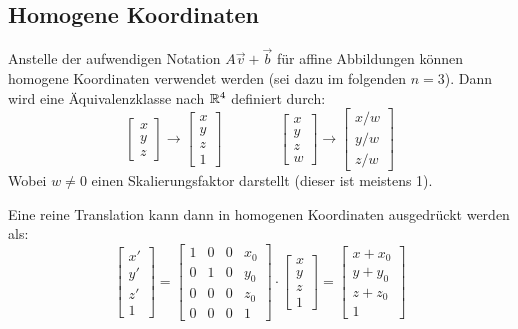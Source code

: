		\subsection{Homogene Koordinaten}
			Anstelle der aufwendigen Notation \( A\vec{v} + \vec{b} \) für affine Abbildungen können homogene Koordinaten verwendet werden (sei dazu im folgenden \( n = 3 \)). Dann wird eine Äquivalenzklasse nach \( \mathbb{R}^4 \) definiert durch:
			\begin{equation*}
				\begin{bmatrix}
					x \\
					y \\
					z
				\end{bmatrix}
				\to
				\begin{bmatrix}
					x \\
					y \\
					z \\
					1
				\end{bmatrix}
				\quad\quad\quad\quad
				\begin{bmatrix}
					x \\
					y \\
					z \\
					w
				\end{bmatrix}
				\to
				\begin{bmatrix}
					x/w \\
					y/w \\
					z/w
				\end{bmatrix}
			\end{equation*}
			Wobei \( w \neq 0 \) einen Skalierungsfaktor darstellt (dieser ist meistens \num{1}).
			
			Eine reine Translation kann dann in homogenen Koordinaten ausgedrückt werden als:
			\begin{equation*}
				\begin{bmatrix}
					x' \\
					y' \\
					z' \\
					1
				\end{bmatrix}
				=
				\begin{bmatrix}
					1 & 0 & 0 & x_0 \\
					0 & 1 & 0 & y_0 \\
					0 & 0 & 0 & z_0 \\
					0 & 0 & 0 & 1
				\end{bmatrix}
				\cdot
				\begin{bmatrix}
					x \\
					y \\
					z \\
					1
				\end{bmatrix}
				=
				\begin{bmatrix}
					x + x_0 \\
					y + y_0 \\
					z + z_0 \\
					1
				\end{bmatrix}
			\end{equation*}
			
